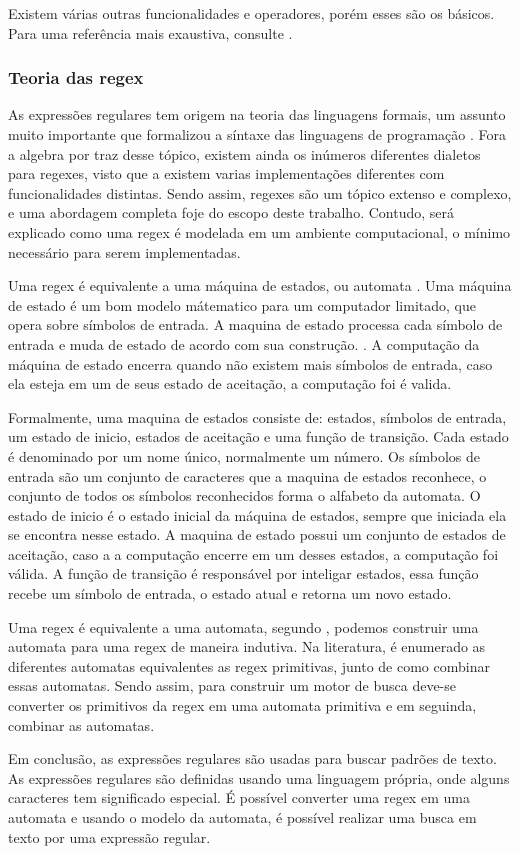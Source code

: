 Existem várias outras funcionalidades e operadores, porém esses são os básicos.
Para uma referência mais exaustiva, consulte \cite{mastering}.

\subsubsection{Teoria das regex}
As expressões regulares tem origem na teoria das linguagens formais, um assunto muito importante que formalizou a síntaxe das linguagens de programação \cite{theory-computation}.
Fora a algebra por traz desse tópico, existem ainda os inúmeros diferentes dialetos para regexes, visto que a existem varias implementações diferentes com funcionalidades distintas.
Sendo assim, regexes são um tópico extenso e complexo, e uma abordagem completa foje do escopo deste trabalho.
Contudo, será explicado como uma regex é modelada em um ambiente computacional, o mínimo necessário para serem implementadas.

Uma regex é equivalente a uma máquina de estados, ou automata \cite{theory-computation}.
Uma máquina de estado é um bom modelo mátematico para um computador limitado, que opera sobre símbolos de entrada.
A maquina de estado processa cada símbolo de entrada e muda de estado de acordo com sua construção. \cite{theory-computation}.
A computação da máquina de estado encerra quando não existem mais símbolos de entrada, caso ela esteja em um de seus estado de aceitação, a computação foi é valida.

Formalmente, uma maquina de estados consiste de: estados, símbolos de entrada, um estado de inicio, estados de aceitação e uma função de transição.
Cada estado é denominado por um nome único, normalmente um número.
Os símbolos de entrada são um conjunto de caracteres que a maquina de estados reconhece, o conjunto de todos os símbolos reconhecidos forma o alfabeto da automata.
O estado de inicio é o estado inicial da máquina de estados, sempre que iniciada ela se encontra nesse estado.
A maquina de estado possui um conjunto de estados de aceitação, caso a a computação encerre em um desses estados, a computação foi válida.
A função de transição é responsável por inteligar estados, essa função recebe um símbolo de entrada, o estado atual e retorna um novo estado. \cite{theory}

Uma regex é equivalente a uma automata, segundo \cite{dragon-book}, podemos construir uma automata para uma regex de maneira indutiva.
Na literatura, é enumerado as diferentes automatas equivalentes as regex primitivas, junto de como combinar essas automatas.
Sendo assim, para  construir um motor de busca deve-se converter os primitivos da regex em uma automata primitiva e em seguinda, combinar as automatas.

Em conclusão, as expressões regulares são usadas para buscar padrões de texto.
As expressões regulares são definidas usando uma linguagem própria, onde alguns caracteres tem significado especial.
É possível converter uma regex em uma automata e usando o modelo da automata, é possível realizar uma busca em texto por uma expressão regular.

